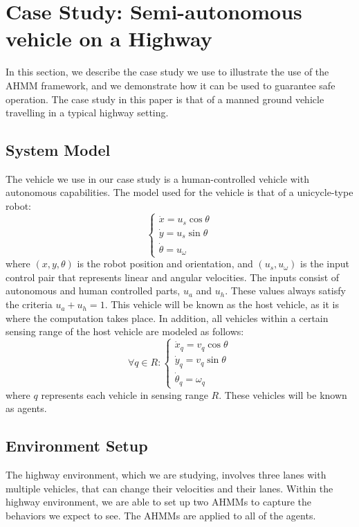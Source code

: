 \documentclass[conference]{IEEEtran}
\begin{document}
\section{Case Study: Semi-autonomous vehicle on a Highway}
In this section, we describe the case study we use to illustrate the use of the AHMM framework, and we demonstrate how it can be used to guarantee safe operation. The case study in this paper is that of a manned ground vehicle travelling in a typical highway setting.

\subsection{System Model}
The vehicle we use in our case study is a human-controlled vehicle with autonomous capabilities. The model used for the vehicle is that of a unicycle-type robot:
\begin{equation}
    \begin{cases}
    \dot{x} = u_s\cos{\theta} \\
    \dot{y} = u_s\sin{\theta} \\
    \dot{\theta} = u_\omega
    \end{cases}
\end{equation}
where $(x,y,\theta)$ is the robot position and orientation, and $(u_s,u_\omega)$ is the input control pair that represents linear and angular velocities. The inputs consist of autonomous and human controlled parts, $u_a$ and $u_h$. These values always satisfy the criteria $u_a+u_h = 1$. This vehicle will be known as the host vehicle, as it is where the computation takes place. In addition, all vehicles within a certain sensing range of the host vehicle are modeled as follows:
\begin{equation} \label{eq:agentpos}
    \forall q \in R:
    \begin{cases}
    \dot{x}_q = v_q\cos{\theta} \\
    \dot{y}_q = v_q\sin{\theta} \\
    \dot{\theta}_q = \omega_q
    \end{cases}
\end{equation}
where $q$ represents each vehicle in sensing range $R$. These vehicles will be known as agents.

\subsection{Environment Setup}
The highway environment, which we are studying, involves three lanes with multiple vehicles, that can change their velocities and their lanes. Within the highway environment, we are able to set up two AHMMs to capture the behaviors we expect to see. The AHMMs are applied to all of the agents.
\end{document}
